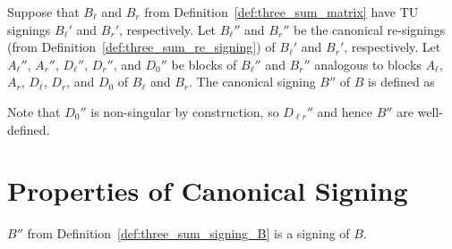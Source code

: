\begin{definition}\label{def:three_sum_signing_B}
    Suppose that $B_{\ell}$ and $B_{r}$ from Definition~\ref{def:three_sum_matrix} have TU signings $B_{\ell}'$ and $B_{r}'$, respectively. Let $B_{\ell}''$ and $B_{r}''$ be the canonical re-signings (from Definition~\ref{def:three_sum_re_signing}) of $B_{\ell}'$ and $B_{r}'$, respectively. Let $A_{\ell}''$, $A_{r}''$, $D_{\ell}''$, $D_{r}''$, and $D_{0}''$ be blocks of $B_{\ell}''$ and $B_{r}''$ analogous to blocks $A_{\ell}$, $A_{r}$, $D_{\ell}$, $D_{r}$, and $D_{0}$ of $B_{\ell}$ and $B_{r}$. The canonical signing $B''$ of $B$ is defined as
    \begin{center}
        \noindent
    \end{center}
    Note that $D_{0}''$ is non-singular by construction, so $D_{\ell r}''$ and hence $B''$ are well-defined.
\end{definition}


\section{Properties of Canonical Signing}

\begin{lemma}\label{lem:three_sum_signing_B_valid}
    $B''$ from Definition~\ref{def:three_sum_signing_B} is a signing of $B$.
\end{lemma}

